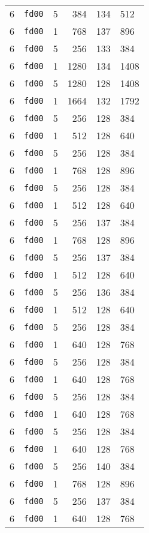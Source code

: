 \documentclass{article}
\begin{document}
\begin{table}[h!]
\begin{tabular}{llrrrl}
    6 & \texttt{fd00} & 5 & 384 & 134 & 512 \\
    6 & \texttt{fd00} & 1 & 768 & 137 & 896 \\
    6 & \texttt{fd00} & 5 & 256 & 133 & 384 \\
    6 & \texttt{fd00} & 1 & 1280 & 134 & 1408 \\
    6 & \texttt{fd00} & 5 & 1280 & 128 & 1408 \\
    6 & \texttt{fd00} & 1 & 1664 & 132 & 1792 \\
    6 & \texttt{fd00} & 5 & 256 & 128 & 384 \\
    6 & \texttt{fd00} & 1 & 512 & 128 & 640 \\
    6 & \texttt{fd00} & 5 & 256 & 128 & 384 \\
    6 & \texttt{fd00} & 1 & 768 & 128 & 896 \\
    6 & \texttt{fd00} & 5 & 256 & 128 & 384 \\
    6 & \texttt{fd00} & 1 & 512 & 128 & 640 \\
    6 & \texttt{fd00} & 5 & 256 & 137 & 384 \\
    6 & \texttt{fd00} & 1 & 768 & 128 & 896 \\
    6 & \texttt{fd00} & 5 & 256 & 137 & 384 \\
    6 & \texttt{fd00} & 1 & 512 & 128 & 640 \\
    6 & \texttt{fd00} & 5 & 256 & 136 & 384 \\
    6 & \texttt{fd00} & 1 & 512 & 128 & 640 \\
    6 & \texttt{fd00} & 5 & 256 & 128 & 384 \\
    6 & \texttt{fd00} & 1 & 640 & 128 & 768 \\
    6 & \texttt{fd00} & 5 & 256 & 128 & 384 \\
    6 & \texttt{fd00} & 1 & 640 & 128 & 768 \\
    6 & \texttt{fd00} & 5 & 256 & 128 & 384 \\
    6 & \texttt{fd00} & 1 & 640 & 128 & 768 \\
    6 & \texttt{fd00} & 5 & 256 & 128 & 384 \\
    6 & \texttt{fd00} & 1 & 640 & 128 & 768 \\
    6 & \texttt{fd00} & 5 & 256 & 140 & 384 \\
    6 & \texttt{fd00} & 1 & 768 & 128 & 896 \\
    6 & \texttt{fd00} & 5 & 256 & 137 & 384 \\
    6 & \texttt{fd00} & 1 & 640 & 128 & 768 \\

\end{tabular}
\end{table}
\end{document}
